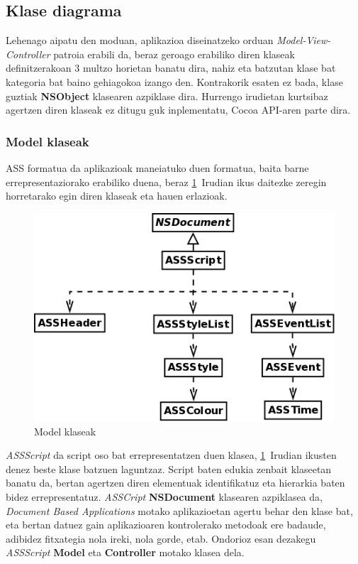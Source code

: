 \newpage
\subsection{Klase diagrama}

Lehenago aipatu den moduan, aplikazioa diseinatzeko orduan \textit{Model-View-Controller} patroia erabili da, beraz geroago erabiliko diren klaseak definitzerakoan 3 multzo horietan banatu dira, nahiz eta batzutan klase bat kategoria bat baino gehiagokoa izango den. Kontrakorik esaten ez bada, klase guztiak \textbf{NSObject} klasearen azpiklase dira. Hurrengo irudietan kurtsibaz agertzen diren klaseak ez ditugu guk inplementatu, Cocoa API-aren parte dira.

\subsubsection{Model klaseak}
ASS formatua da aplikazioak maneiatuko duen formatua, baita barne errepresentaziorako erabiliko duena, beraz \ref{kd-model}~Irudian ikus daitezke zeregin horretarako egin diren klaseak eta hauen erlazioak.
\begin{figure}[htp]
\begin{center}
\includegraphics[scale=0.4]{Pictures/Chapter4/Diseinua/KD-Model.png}
\caption{Model klaseak}
\label{kd-model}
\end{center}
\end{figure}
\textit{ASSScript} da script oso bat errepresentatzen duen klasea, \ref{kd-model}~Irudian ikusten denez beste klase batzuen laguntzaz. Script baten edukia zenbait klaseetan banatu da, bertan agertzen diren elementuak identifikatuz eta hierarkia baten bidez errepresentatuz. \textit{ASSCript} \textbf{NSDocument} klasearen azpiklasea da, \textit{Document Based Applications} motako aplikazioetan agertu behar den klase bat, eta bertan datuez gain aplikazioaren kontrolerako metodoak ere badaude, adibidez fitxategia nola ireki, nola gorde, etab. Ondorioz esan dezakegu \textit{ASSScript} \textbf{Model} eta \textbf{Controller} motako klasea dela.

